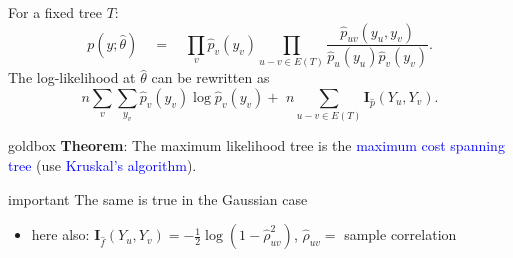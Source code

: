 \documentclass[dvipsnames,aspectratio=169]{beamer} %
\newcommand{\bs}{\boldsymbol}
\begin{document}
\begin{frame}
	\frametitle{}
For a fixed tree $T$: $$
p( y;\hat \theta) \quad=\quad \prod_{v}\hat p_{v}(y_{v})\prod_{u- v\in E(T)} \frac{\hat p_{uv}(y_{u},y_{v})}{\hat p_{u}(y_{u})\hat p_{v}(y_{v})}.
$$
The log-likelihood at $\hat \theta$ can be rewritten as
$$
n\sum_{v}\sum_{y_{v}}\hat p_{v}(y_{v})\log \hat p_{v}(y_{v})+\,\,n\!\!\!\!\!\!\sum_{u- v\in E(T)} \bs I_{\hat p}(Y_{u},Y_{v}).
$$
\begin{beamercolorbox}[wd=\paperwidth,sep=5pt]{goldbox}
	\textbf{Theorem}: The maximum likelihood tree is the \textcolor{blue}{maximum cost spanning tree} (use \textcolor{blue}{Kruskal's algorithm}).
\end{beamercolorbox}
\medskip 

\begin{beamercolorbox}[wd=\paperwidth,sep=5pt]{important}
	The same is true in the Gaussian case
\begin{itemize}
\item here also: $\bs I_{\hat f}(Y_{u},Y_{v})=-\frac{1}{2}\log(1-\hat\rho_{uv}^{2})$, $\hat\rho_{uv}=$ sample correlation
\end{itemize}
\end{beamercolorbox}
\end{frame}
\note[itemize]{\item 
}
\end{document}
